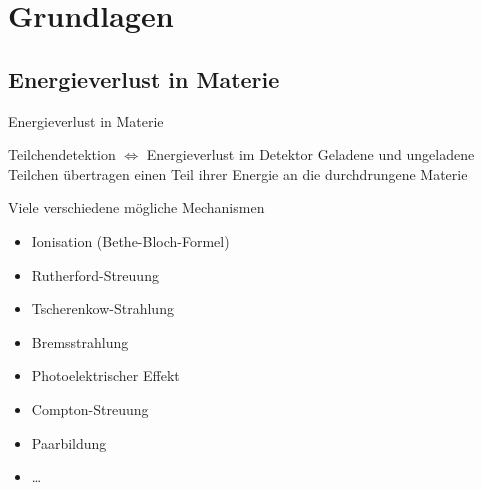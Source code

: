 \documentclass{beamer}
\begin{document}

\section{Grundlagen}


\subsection{Energieverlust in Materie}


\begin{frame}{Energieverlust in Materie}
	\begin{block}{Teilchendetektion $\Leftrightarrow$ Energieverlust im Detektor}
		Geladene und ungeladene Teilchen übertragen einen Teil ihrer Energie an die
		durchdrungene Materie	
	\end{block}
	
	
	\begin{block}{Viele verschiedene mögliche Mechanismen}
		\begin{itemize}
		  \item Ionisation (Bethe-Bloch-Formel)
		  \item Rutherford-Streuung
		  \item Tscherenkow-Strahlung
		  \item Bremsstrahlung
		  \item Photoelektrischer Effekt
		  \item Compton-Streuung
		  \item Paarbildung
		  \item \ldots
		\end{itemize}
	\end{block}
\end{frame}

\end{document}

